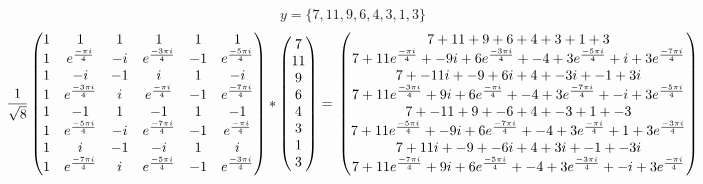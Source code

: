 \documentclass{article}
\begin{document}
\[ y = \{7, 11, 9, 6, 4, 3, 1, 3\}  \]
\[ 
  \frac{1}{\sqrt{8}}
	\begin{pmatrix}
		1 & 1                      & 1  & 1                      & 1  & 1             \\
		1 & e^{\frac{- \pi i}{4}}  & -i & e^{\frac{-3 \pi i}{4}} & -1 & e^{\frac{-5 \pi i}{4}}        \\
		1 & -i                     & -1 & i                      & 1  & -i        \\
		1 & e^{\frac{-3 \pi i}{4}} & i  & e^{\frac{- \pi i}{4}}  & -1 & e^{\frac{-7 \pi i}{4}}      \\
		1 & -1                     & 1  & -1                     & 1  & -1         \\
		1 & e^{\frac{-5 \pi i}{4}} & -i & e^{\frac{-7 \pi i}{4}} & -1 & e^{\frac{- \pi i}{4}}         \\
		1 & i                      & -1 & -i                     & 1  & i        \\
		1 & e^{\frac{-7 \pi i}{4}} & i  & e^{\frac{-5 \pi i}{4}} & -1 & e^{\frac{-3 \pi i}{4}}
	\end{pmatrix}
	*
	\begin{pmatrix}
		7 \\
		11 \\
		9 \\
		6 \\
		4 \\
		3 \\
		1 \\
		3 
	\end{pmatrix}
	=  \\
	\begin{pmatrix}
		7 + 11                        + 9   + 6                        + 4   + 3                        + 1    + 3 \\
		7 + 11 e^{\frac{- \pi i}{4}}  + -9i + 6e^{\frac{-3 \pi i}{4}}  + -4  + 3 e^{\frac{-5 \pi i}{4}} + i   + 3 e^{\frac{-7 \pi i}{4}}  \\
		7 + -11i                      + -9  + 6i                       + 4   + -3i                      + -1   + 3i \\
		7 + 11e^{\frac{- 3 \pi i}{4}} + 9i  + 6 e^{\frac{- \pi i}{4}}  + -4  + 3 e^{\frac{- 7\pi i}{4}} + -i + 3e^{\frac{-5 \pi i}{4}} \\
		7 + -11                       + 9   + -6                       + 4   + -3                       + 1    + -3 \\
		7 + 11e^{\frac{-5\pi i}{4}}   + -9i + 6 e^{\frac{-7 \pi i}{4}} + -4  + 3 e^{\frac{- \pi i}{4}}  + 1    + 3 e^{\frac{-3\pi i}{4}} \\
		7 + 11i                       + -9  + -6i                      + 4   + 3i                       + -1   + -3i \\
		7 + 11e^{\frac{-7\pi i}{4}}   + 9i  + 6 e^{\frac{-5\pi i}{4}}  + -4  + 3 e^{\frac{-3\pi i}{4}}  + -i  + 3 e^{\frac{- \pi i}{4}}
	\end{pmatrix}
\]
\end{document}
